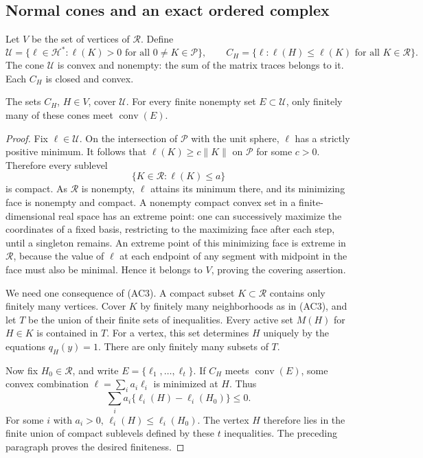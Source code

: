 \subsection{Normal cones and an exact ordered complex}

Let $V$ be the set of vertices of $\mathcal R$.  Define
\[
 \mathcal U=\{\ell\in\mathcal H^*:
            \ell(K)>0\text{ for all }0\ne K\in\mathcal P\},
 \qquad
 C_H=\{\ell:\ell(H)\le\ell(K)\text{ for all }K\in\mathcal R\}.
 \tag{AC5}
\]
The cone $\mathcal U$ is convex and nonempty: the sum of the
matrix traces belongs to it.  Each $C_H$ is closed and convex.

\begin{lemma}\label{ac-normal-cover}
The sets $C_H$, $H\in V$, cover $\mathcal U$.
For every finite nonempty set $E\subset\mathcal U$, only finitely
many of these cones meet $\operatorname{conv}(E)$.
\end{lemma}
\begin{proof}
Fix $\ell\in\mathcal U$.  On the intersection of $\mathcal P$
with the unit sphere, $\ell$ has a strictly positive minimum.
It follows that $\ell(K)\ge c\|K\|$ on $\mathcal P$ for some
$c>0$.  Therefore every sublevel
\[
          \{K\in\mathcal R:\ell(K)\le a\}
\]
is compact.  As $\mathcal R$ is nonempty, $\ell$ attains its
minimum there, and its minimizing face is nonempty and compact.
A nonempty compact convex set in a finite-dimensional real
space has an extreme point: one can successively maximize the
coordinates of a fixed basis, restricting to the maximizing
face after each step, until a singleton remains.
An extreme point of this minimizing face is extreme in
$\mathcal R$, because the value of $\ell$ at each endpoint
of any segment with midpoint in the face must also be minimal.
Hence it belongs to $V$, proving the covering assertion.

We need one consequence of (AC3).  A compact subset
$K\subset\mathcal R$ contains only finitely many vertices.
Cover $K$ by finitely many neighborhoods as in (AC3), and let
$T$ be the union of their finite sets of inequalities.
Every active set $M(H)$ for $H\in K$ is contained in $T$.
For a vertex, this set determines $H$ uniquely by the
equations $q_H(y)=1$.  There are only finitely many subsets
of $T$.

Now fix $H_0\in\mathcal R$, and write
$E=\{\ell_1,\ldots,\ell_t\}$.  If $C_H$ meets
$\operatorname{conv}(E)$, some convex combination
$\ell=\sum_i a_i\ell_i$ is minimized at $H$.  Thus
\[
                 \sum_i a_i\{\ell_i(H)-\ell_i(H_0)\}\le0.
\]
For some $i$ with $a_i>0$, $\ell_i(H)\le\ell_i(H_0)$.
The vertex $H$ therefore lies in the finite union of compact
sublevels defined by these $t$ inequalities.  The preceding
paragraph proves the desired finiteness.
\end{proof}


